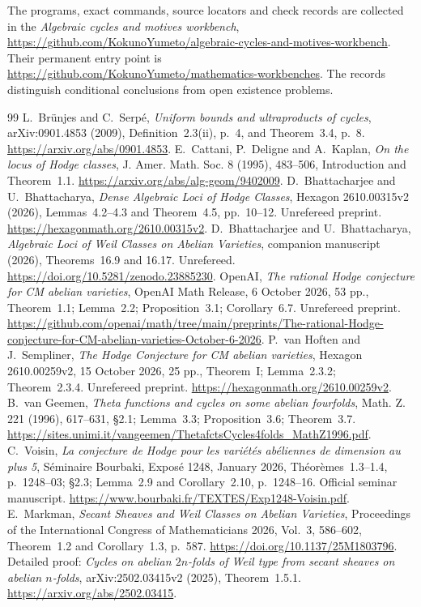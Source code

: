 \documentclass[11pt]{article}
\theoremstyle{definition}
\theoremstyle{remark}
\newcommand{\workbenchurl}{https://github.com/KokunoYumeto/algebraic-cycles-and-motives-workbench}
\newcommand{\recordurl}{https://github.com/KokunoYumeto/mathematics-workbenches}
\begin{document}
The programs, exact commands, source locators and check records are
collected in the \emph{Algebraic cycles and motives workbench},
\url{\workbenchurl}. Their permanent entry point is
\url{\recordurl}. The records distinguish conditional conclusions
from open existence problems.
\begin{thebibliography}{99}
 L.~Br\"unjes and C.~Serp\'e, \emph{Uniform bounds and ultraproducts of cycles}, arXiv:0901.4853 (2009), Definition~2.3(ii), p.~4, and Theorem~3.4, p.~8. \url{https://arxiv.org/abs/0901.4853}.
 E.~Cattani, P.~Deligne and A.~Kaplan, \emph{On the locus of Hodge classes}, J. Amer. Math. Soc. 8 (1995), 483--506, Introduction and Theorem~1.1. \url{https://arxiv.org/abs/alg-geom/9402009}.
 D.~Bhattacharjee and U.~Bhattacharya, \emph{Dense Algebraic Loci of Hodge Classes}, Hexagon 2610.00315v2 (2026), Lemmas~4.2--4.3 and Theorem~4.5, pp.~10--12. Unrefereed preprint. \url{https://hexagonmath.org/2610.00315v2}.
 D.~Bhattacharjee and U.~Bhattacharya, \emph{Algebraic Loci of Weil Classes on Abelian Varieties}, companion manuscript (2026), Theorems~16.9 and 16.17. Unrefereed. \url{https://doi.org/10.5281/zenodo.23885230}.
 OpenAI, \emph{The rational Hodge conjecture for CM abelian varieties}, OpenAI Math Release, 6 October 2026, 53 pp., Theorem~1.1; Lemma~2.2; Proposition~3.1; Corollary~6.7. Unrefereed preprint. \url{https://github.com/openai/math/tree/main/preprints/The-rational-Hodge-conjecture-for-CM-abelian-varieties-October-6-2026}.
 P.~van Hoften and J.~Sempliner, \emph{The Hodge Conjecture for CM abelian varieties}, Hexagon 2610.00259v2, 15 October 2026, 25 pp., Theorem~I; Lemma~2.3.2; Theorem~2.3.4. Unrefereed preprint. \url{https://hexagonmath.org/2610.00259v2}.
 B.~van Geemen, \emph{Theta functions and cycles on some abelian fourfolds}, Math. Z. 221 (1996), 617--631, \S2.1; Lemma~3.3; Proposition~3.6; Theorem~3.7. \url{https://sites.unimi.it/vangeemen/ThetafctsCycles4folds_MathZ1996.pdf}.
 C.~Voisin, \emph{La conjecture de Hodge pour les vari\'et\'es ab\'eliennes de dimension au plus 5}, S\'eminaire Bourbaki, Expos\'e 1248, January 2026, Th\'eor\`emes~1.3--1.4, p.~1248--03; \S2.3; Lemma~2.9 and Corollary~2.10, p.~1248--16. Official seminar manuscript. \url{https://www.bourbaki.fr/TEXTES/Exp1248-Voisin.pdf}.
 E.~Markman, \emph{Secant Sheaves and Weil Classes on Abelian Varieties}, Proceedings of the International Congress of Mathematicians 2026, Vol.~3, 586--602, Theorem~1.2 and Corollary~1.3, p.~587. \url{https://doi.org/10.1137/25M1803796}. Detailed proof: \emph{Cycles on abelian $2n$-folds of Weil type from secant sheaves on abelian $n$-folds}, arXiv:2502.03415v2 (2025), Theorem~1.5.1. \url{https://arxiv.org/abs/2502.03415}.

\end{thebibliography}
\end{document}
